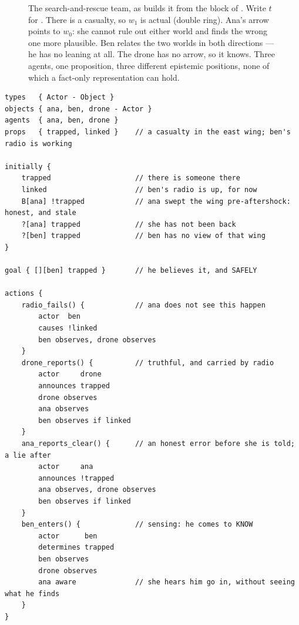\documentclass[11pt,a4paper]{article}
\begin{document}
\begin{figure}[t]
\centering
{}
\caption{The search-and-rescue team, as \delhi{} builds it from the  block
of . Write $t$ for . There is a casualty, so $w_1$ is actual
(double ring). Ana's arrow points to $w_0$: she cannot rule out either world and finds the wrong
one more plausible. Ben relates the two worlds in both directions --- he has no leaning at all.
The drone has no arrow, so it knows. Three agents, one proposition, three
different epistemic positions, none of which a fact-only representation can hold.}
\label{fig:sar}
\end{figure}
\begin{lstlisting}[float=p,caption={\code{search\_rescue.delhi}. Sections are explained in
\Cref{sec:surface}; for now note only that nothing here is a Kripke structure. The modeller
states what is true, what is believed, and who observes what --- and \delhi{} derives
\Cref{fig:sar} and the event models from that.},captionpos=b,label=lst:sar]
types   { Actor - Object }
objects { ana, ben, drone - Actor }
agents  { ana, ben, drone }
props   { trapped, linked }    // a casualty in the east wing; ben's radio is working

initially {
    trapped                    // there is someone there
    linked                     // ben's radio is up, for now
    B[ana] !trapped            // ana swept the wing pre-aftershock: honest, and stale
    ?[ana] trapped             // she has not been back
    ?[ben] trapped             // ben has no view of that wing
}

goal { [][ben] trapped }       // he believes it, and SAFELY

actions {
    radio_fails() {            // ana does not see this happen
        actor  ben
        causes !linked
        ben observes, drone observes
    }
    drone_reports() {          // truthful, and carried by radio
        actor     drone
        announces trapped
        drone observes
        ana observes
        ben observes if linked
    }
    ana_reports_clear() {      // an honest error before she is told; a lie after
        actor     ana
        announces !trapped
        ana observes, drone observes
        ben observes if linked
    }
    ben_enters() {             // sensing: he comes to KNOW
        actor      ben
        determines trapped
        ben observes
        drone observes
        ana aware              // she hears him go in, without seeing what he finds
    }
}
\end{lstlisting}
\end{document}
